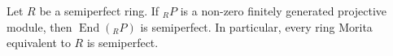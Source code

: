 Let $R$ be a semiperfect ring. If ${}_R P$ is a non-zero finitely generated projective module, then $\operatorname{End}({}_R P)$ is semiperfect. In particular, every ring Morita equivalent to $R$ is semiperfect.
